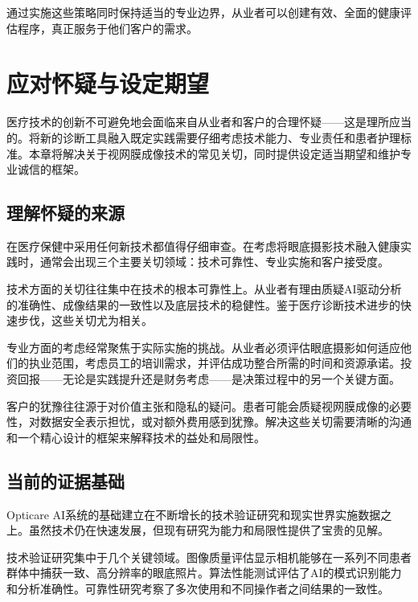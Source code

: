 \documentclass[
  Letterpaper,
]{scrbook}
\begin{document}
通过实施这些策略同时保持适当的专业边界，从业者可以创建有效、全面的健康评估程序，真正服务于他们客户的需求。


\chapter{应对怀疑与设定期望}\label{ux5e94ux5bf9ux6000ux7591ux4e0eux8bbeux5b9aux671fux671b}

医疗技术的创新不可避免地会面临来自从业者和客户的合理怀疑------这是理所应当的。将新的诊断工具融入既定实践需要仔细考虑技术能力、专业责任和患者护理标准。本章将解决关于视网膜成像技术的常见关切，同时提供设定适当期望和维护专业诚信的框架。

\section{理解怀疑的来源}\label{ux7406ux89e3ux6000ux7591ux7684ux6765ux6e90}

在医疗保健中采用任何新技术都值得仔细审查。在考虑将眼底摄影技术融入健康实践时，通常会出现三个主要关切领域：技术可靠性、专业实施和客户接受度。

技术方面的关切往往集中在技术的根本可靠性上。从业者有理由质疑AI驱动分析的准确性、成像结果的一致性以及底层技术的稳健性。鉴于医疗诊断技术进步的快速步伐，这些关切尤为相关。

专业方面的考虑经常聚焦于实际实施的挑战。从业者必须评估眼底摄影如何适应他们的执业范围，考虑员工的培训需求，并评估成功整合所需的时间和资源承诺。投资回报------无论是实践提升还是财务考虑------是决策过程中的另一个关键方面。

客户的犹豫往往源于对价值主张和隐私的疑问。患者可能会质疑视网膜成像的必要性，对数据安全表示担忧，或对额外费用感到犹豫。解决这些关切需要清晰的沟通和一个精心设计的框架来解释技术的益处和局限性。

\section{当前的证据基础}\label{ux5f53ux524dux7684ux8bc1ux636eux57faux7840}

Opticare
AI系统的基础建立在不断增长的技术验证研究和现实世界实施数据之上。虽然技术仍在快速发展，但现有研究为能力和局限性提供了宝贵的见解。

技术验证研究集中于几个关键领域。图像质量评估显示相机能够在一系列不同患者群体中捕获一致、高分辨率的眼底照片。算法性能测试评估了AI的模式识别能力和分析准确性。可靠性研究考察了多次使用和不同操作者之间结果的一致性。
\end{document}
